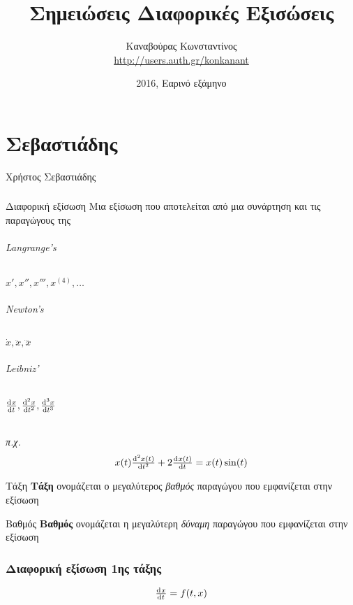 \documentclass[11pt,a4paper,titlepage,draft]{article}
\title{Σημειώσεις Διαφορικές Εξισώσεις}
\date{2016, Εαρινό εξάμηνο}
\author{Καναβούρας Κωνσταντίνος \\ \textlatin{\url{http://users.auth.gr/konkanant}}}
\begin{document}
\maketitle


\newpage

\part{Σεβαστιάδης}
Χρήστος Σεβαστιάδης

\section{}

\begin{defn*}{Διαφορική εξίσωση}
Μια εξίσωση που αποτελείται από μια συνάρτηση και τις παραγώγους της
\end{defn*}

\paragraph{\textlatin{Langrange's}}
\(x',x'',x''',x^{(4)},\dots\)
\paragraph{\textlatin{Newton's}}
\(\dot{x}, \ddot{x}, \dddot{x}\)
\paragraph{\textlatin{Leibniz'}}
\(\od{x}{t}, \od[2]{x}{t}, \od[3]{x}{t}\)

\paragraph{}
\textit{π.χ.}
\[
x(t) \od[2]{x(t)}{t} + 2 \od{x(t)}{t}=x(t)\sin (t)
\]

\begin{defn}{Τάξη}{}
\textbf{Τάξη} ονομάζεται ο μεγαλύτερος \emph{βαθμός} παραγώγου που εμφανίζεται στην εξίσωση
\end{defn}

\begin{defn}{Βαθμός}{}
\textbf{Βαθμός} ονομάζεται η μεγαλύτερη \emph{δύναμη} παραγώγου που εμφανίζεται στην εξίσωση
\end{defn}


\section{Διαφορική εξίσωση 1ης τάξης}
\begin{defn*}{}
\[
\od{x}{t}=f(t,x)
\]
\end{defn*}
\end{document}
